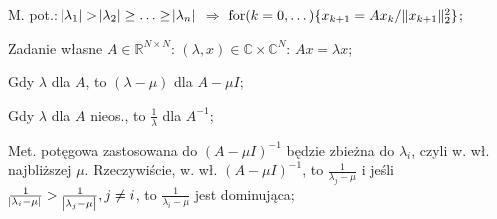 
\entry
M. pot.:
$\abs{\lambda_1}>\abs{\lambda_2}\geq\ldots\geq\abs{\lambda_n}$
$\Rightarrow$
$\mathrm{for}(k=0,\dots)\{x_{k+1}=Ax_k / \|x_{k+1}\|^2_2\}$;

\entry
Zadanie własne $A \in \mathbb{R}^{N \times N}$:
$(\lambda,x) \in \mathbb{C} \times \mathbb{C}^N$:
$Ax = \lambda x$;

\entry
Gdy $\lambda$ dla $A$, to $(\lambda - \mu)$ dla $A-\mu I$;

\entry
Gdy $\lambda$ dla $A$ nieos., to $\frac{1}{\lambda}$ dla $A^{-1}$;

\entry
Met. potęgowa zastosowana do
$(A-\mu I)^{-1}$
będzie zbieżna do
$\lambda_i$,
czyli w. wł. najbliższej $\mu$.
Rzeczywiście, w. wł.
$(A-\mu I)^{-1}$,
to
$\frac{1}{\lambda_j-\mu}$
i jeśli
$\frac{1}{\abs{\lambda_i-\mu}} > \frac{1}{\abs{\lambda_j-\mu}}, j\neq i$,
to
$\frac{1}{\lambda_i-\mu}$
jest dominująca;







